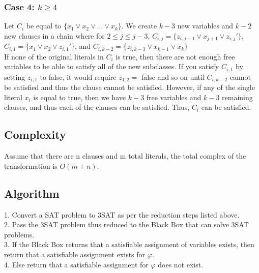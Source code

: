 \documentclass{article}
\theoremstyle{definition}
\theoremstyle{remark}
\theoremstyle{plain}
\begin{document}
\subsubsection*{Case 4: $k \geq 4$}
Let $C_i$ be equal to $\{x_1 \vee x_2 \vee \ldots \vee x_k\}$. We create $k-3$ new variables and $k-2$ new clauses in a chain where for $2 \leq j \leq j-3$, $C_{i,j} = \{z_{i,j-1} \vee x_{j+1} \vee z_{i,j}'\}$, $C_{i,1} = \{x_1 \vee x_2 \vee z_{i,1}'\}$, and $C_{i, k-2} = \{z_{i,k-3} \vee x_{k-1} \vee x_k\}$\\

If none of the original literals in $C_i$ is true, then there are not enough free variables to be able to satisfy all of the new subclasses. If you satisfy  $C_{i,1}$ by setting $z_{i,1}$ to false, it would require $z_{1,2} = $ false and so on until $C_{i,k-2}$ cannot be satisfied and thus the clause cannot be satisfied. However, if any of the single literal $x_i$ is equal to true, then we have $k-3$ free variables and $k-3$ remaining clauses, and thus each of the clauses can be satisfied. Thus, $C_i$ can be satisfied.

\subsection*{Complexity}
Assume that there are n clauses and m total literals, the total complex of the transformation is $O(m+n)$.

\subsection*{Algorithm}
1. Convert a SAT problem to 3SAT as per the reduction steps listed above.\\
2. Pass the 3SAT problem thus reduced to the Black Box that can solve 3SAT problems.\\
3. If the Black Box returns that a satisfiable assignment of variables exists, then return that a satisfiable assignment exists for $\varphi$.\\
4. Else return that a satisfiable assignment for $\varphi$ does not exist.
\end{document}

